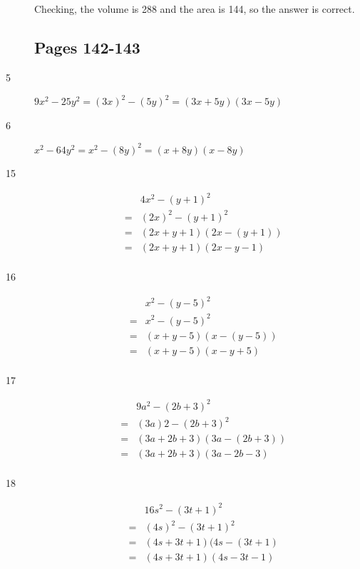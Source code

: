 \documentclass[fleqn,addpoints]{exam}
\begin{document}
\begin{description}
Checking, the volume is 288 and the area is 144, so the answer is correct.

\subsection{Pages 142-143}

\item[5]
\( 9x^2 - 25y^2 = (3x)^2 - (5y)^2 = (3x + 5y)(3x - 5y) \)

\item[6]
\( x^2 - 64y^2 = x^2 - (8y)^2 = (x + 8y)(x - 8y) \)

\item[15]
\begin{eqnarray*}
  &&  4x^2 - (y + 1)^2 \\
  &=& (2x)^2 - (y + 1)^2 \\
  &=& (2x + y + 1)(2x - (y + 1)) \\ 
  &=& (2x + y + 1)(2x - y - 1) \\ 
\end{eqnarray*}

\item[16]
\begin{eqnarray*}
  &&  x^2 - (y - 5)^2\\
  &=& x^2 - (y - 5)^2 \\
  &=& (x + y - 5)(x - (y - 5)) \\ 
  &=& (x + y - 5)(x - y + 5) \\ 
\end{eqnarray*}

\item[17]
\begin{eqnarray*}
  &&  9a^2 - (2b + 3)^2 \\
  &=& (3a)2 - (2b + 3)^2 \\
  &=& (3a + 2b + 3)(3a - (2b + 3)) \\ 
  &=& (3a + 2b + 3)(3a - 2b - 3) \\ 
\end{eqnarray*}

\item[18]
\begin{eqnarray*}
  &&  16s^2 - (3t + 1)^2 \\
  &=& (4s)^2 - (3t + 1)^2 \\
  &=& (4s + 3t + 1)(4s - (3t + 1) \\ 
  &=& (4s + 3t + 1)(4s - 3t - 1) \\ 
\end{eqnarray*}


\end{description}
\end{document}
